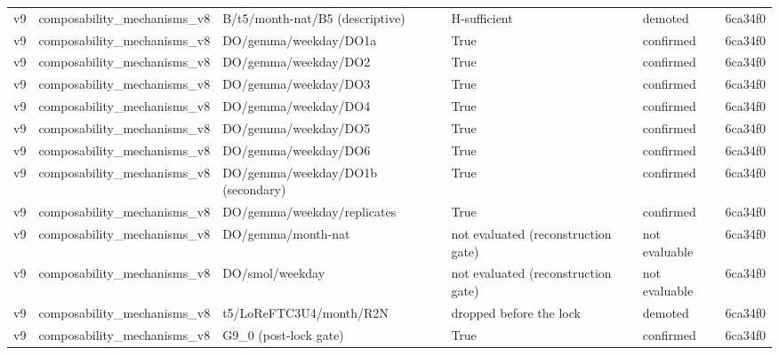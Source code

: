 \begin{longtable}{llllll}
v9 & composability\_mechanisms\_v8 & B/t5/month-nat/B5 (descriptive) & H-sufficient & demoted & 6ca34f0 \\
v9 & composability\_mechanisms\_v8 & DO/gemma/weekday/DO1a & True & confirmed & 6ca34f0 \\
v9 & composability\_mechanisms\_v8 & DO/gemma/weekday/DO2 & True & confirmed & 6ca34f0 \\
v9 & composability\_mechanisms\_v8 & DO/gemma/weekday/DO3 & True & confirmed & 6ca34f0 \\
v9 & composability\_mechanisms\_v8 & DO/gemma/weekday/DO4 & True & confirmed & 6ca34f0 \\
v9 & composability\_mechanisms\_v8 & DO/gemma/weekday/DO5 & True & confirmed & 6ca34f0 \\
v9 & composability\_mechanisms\_v8 & DO/gemma/weekday/DO6 & True & confirmed & 6ca34f0 \\
v9 & composability\_mechanisms\_v8 & DO/gemma/weekday/DO1b (secondary) & True & confirmed & 6ca34f0 \\
v9 & composability\_mechanisms\_v8 & DO/gemma/weekday/replicates & True & confirmed & 6ca34f0 \\
v9 & composability\_mechanisms\_v8 & DO/gemma/month-nat & not evaluated (reconstruction gate) & not evaluable & 6ca34f0 \\
v9 & composability\_mechanisms\_v8 & DO/smol/weekday & not evaluated (reconstruction gate) & not evaluable & 6ca34f0 \\
v9 & composability\_mechanisms\_v8 & t5/LoReFTC3U4/month/R2N & dropped before the lock & demoted & 6ca34f0 \\
v9 & composability\_mechanisms\_v8 & G9\_0 (post-lock gate) & True & confirmed & 6ca34f0 \\
\bottomrule
\end{longtable}
